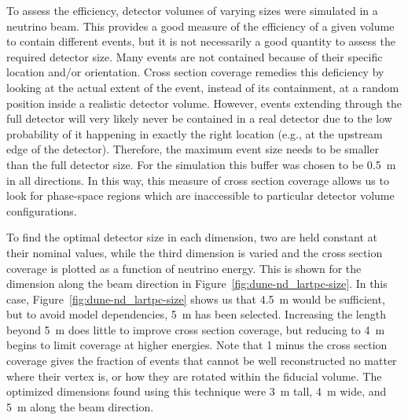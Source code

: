 To assess the efficiency, detector volumes of varying sizes were simulated in a neutrino beam.
This provides a good measure of the efficiency of a given volume to contain different events, but it is not necessarily a good quantity to assess the required detector size.
Many events are not contained because of their specific location and/or orientation.
Cross section coverage remedies this deficiency by looking at the actual extent of the event, instead of its containment, at a random position inside a realistic detector volume.
However, events extending through the full detector will very likely never be contained in a real detector due to the low probability of it happening in exactly the right location (e.g., at the upstream edge of the detector).
Therefore, the maximum event size needs to be smaller than the full detector size.
For the  simulation this buffer was chosen to be \SI{0.5}{\metre} in all directions.
In this way, this measure of cross section coverage allows us to look for phase-space regions which are inaccessible to particular detector volume configurations.

To find the optimal detector size in each dimension, two are held constant at their nominal values, while the third dimension is varied and the cross section coverage is plotted as a function of neutrino energy. 
This is shown for the dimension along the beam direction in Figure~\ref{fig:dune-nd_lartpc-size}. In this case, Figure~\ref{fig:dune-nd_lartpc-size} shows us that
\SI{4.5}{\metre} would be sufficient, but to avoid model dependencies, \SI{5}{\metre} has been selected.
Increasing the length beyond \SI{5}{\metre} does little to improve cross section coverage, but reducing to \SI{4}{\metre} begins to limit coverage at higher energies.
Note that 1 minus the cross section coverage gives the fraction of events that cannot be well reconstructed no matter where their vertex is, or how they are rotated within the fiducial volume. The optimized dimensions found using this technique were \SI{3}{\metre} tall, \SI{4}{\metre} wide, and \SI{5}{\metre} along the beam direction.

